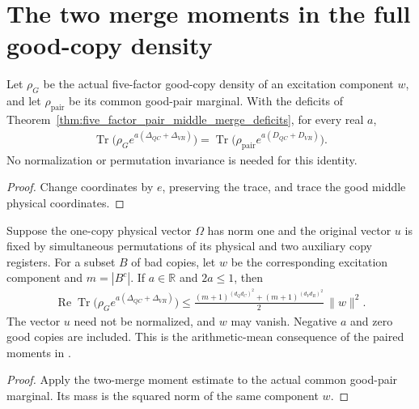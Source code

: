 \section{The two merge moments in the full good-copy density}
\label{sec:replica_good_configuration_merge_moment}

\begin{theorem}
\label{thm:replica_good_configuration_merge_expectation}
\leanok
Let $\rho_G$ be the actual five-factor good-copy density of an
excitation component $w$, and let $\rho_{\mathrm{pair}}$ be its
common good-pair marginal. With the deficits of
Theorem~\ref{thm:five_factor_pair_middle_merge_deficits}, for every
real $a$,
\begin{align*}
 \operatorname{Tr}\bigl(\rho_G e^{a(\Delta_{QC}+\Delta_{VR})}\bigr)
 =\operatorname{Tr}\bigl(\rho_{\mathrm{pair}}
   e^{a(D_{QC}+D_{VR})}\bigr).
\end{align*}
No normalization or permutation invariance is needed for this identity.
\end{theorem}
\begin{proof}\leanok
{}
Change coordinates by $e$, preserving the trace, and trace the good
middle physical coordinates.
\end{proof}

\begin{theorem}
\label{thm:replica_good_configuration_merge_moment_bound}
\leanok
Suppose the one-copy physical vector $\Omega$ has norm one and the
original vector $u$ is fixed by simultaneous permutations of its
physical and two auxiliary copy registers. For a subset $B$ of bad
copies, let $w$ be the corresponding excitation component and
$m=|B^c|$. If $a\in\mathbb R$ and $2a\leq1$, then
\begin{align*}
 \operatorname{Re}\operatorname{Tr}
   \bigl(\rho_G e^{a(\Delta_{QC}+\Delta_{VR})}\bigr)
 \leq \frac{(m+1)^{(d_Qd_C)^2}+(m+1)^{(d_Vd_R)^2}}{2}\,
   \|w\|^2.
\end{align*}
The vector $u$ need not be normalized, and $w$ may vanish. Negative
$a$ and zero good copies are included. This is the arithmetic-mean
consequence of the paired moments in
\cite[Section~8, lines~520--555]{OpenAI2026AreaLaw}.
\end{theorem}
\begin{proof}\leanok
{}
Apply the two-merge moment estimate to the actual common good-pair
marginal. Its mass is the squared norm of the same component $w$.
\end{proof}
